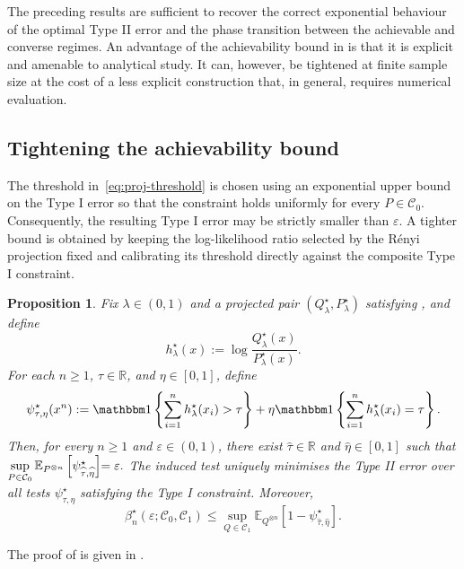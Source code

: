 \documentclass[journal,10pt,draftclsnofoot,onecolumn]{IEEEtran}
\newtheorem{proposition}{Proposition}
\begin{document}
The preceding results are sufficient to recover the correct exponential behaviour of the optimal Type II error and the phase transition between the achievable and converse regimes. An advantage of the achievability bound in  is that it is explicit and amenable to analytical study. It can, however, be tightened at finite sample size at the cost of a less explicit construction that, in general, requires numerical evaluation.
\subsection{Tightening the achievability bound}
\label{subsec:projected-tightening}

The threshold in~\eqref{eq:proj-threshold} is chosen using an exponential upper bound on the Type I error so that the constraint holds uniformly for every $P\in\mathcal C_0$. Consequently, the resulting Type I error may be strictly smaller than $\varepsilon$. A tighter bound is obtained by keeping the log-likelihood ratio selected by the R\'enyi projection fixed and calibrating its threshold directly against the composite Type I constraint.

\begin{proposition}
\label{prop:projected-tightening} 
Fix $\lambda\in(0,1)$ and a projected pair $(Q_\lambda^\star,P_\lambda^\star)$ satisfying , and define 
\begin{equation} 
h_\lambda^\star(x) := \log\frac{Q_\lambda^\star(x)}{P_\lambda^\star(x)}.
\label{eq:projected-log-likelihood-ratio}
\end{equation} 
For each $n\geq1$, $\tau\in\mathbb R$, and $\eta\in[0,1]$, define 
\begin{equation*} \psi_{\tau,\eta}^\star(x^n) := \mathbbm 1 \left\{ \sum_{i=1}^n h_\lambda^\star(x_i)>\tau \right\} + \eta\mathbbm 1 \left\{ \sum_{i=1}^n h_\lambda^\star(x_i)=\tau \right\}. 
\end{equation*} 
Then, for every $n\geq1$ and $\varepsilon\in(0,1)$, there exist $\widehat\tau\in\mathbb R$ and $\widehat\eta\in[0,1]$ such that $\sup\limits_{P\in\mathcal C_0} \mathbb E_{P^{\otimes n}} \left[ \psi_{\widehat\tau,\widehat\eta}^\star \right]\hspace{-0.1cm}= \varepsilon.$ The induced test uniquely minimises the Type II error over all tests $\psi_{\tau,\eta}^\star$ satisfying the Type I constraint. Moreover, 
\begin{equation} \beta_n^\star(\varepsilon;\mathcal C_0,\mathcal C_1) \leq \sup_{Q\in\mathcal C_1} \mathbb E_{Q^{\otimes n}} \left[ 1-\psi_{\widehat\tau,\widehat\eta}^\star \right].
\label{eq:projected-threshold-type-two-value}
\end{equation}
\end{proposition}
The proof of  is given in .
\end{document}
